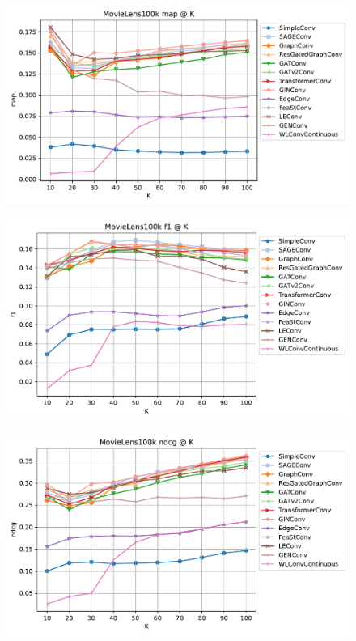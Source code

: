 \documentclass[bst/sn-nature]{sn-jnl}
\begin{document}
\begin{multicols}{2}
\begin{figure}
\begin{center}
\begin{minipage}[b]{0.48\textwidth}
    \centering
    \includegraphics[width=\textwidth]{imgs/MovieLens100k_map.pdf}
    \label{fig:map}
\end{minipage}
\hfill
\begin{minipage}[b]{0.48\textwidth}
    \centering
    \includegraphics[width=\textwidth]{imgs/MovieLens100k_f1.pdf}
    \label{fig:f1}
\end{minipage}

\begin{minipage}[b]{0.48\textwidth}
    \centering
    \includegraphics[width=\textwidth]{imgs/MovieLens100k_ndcg.pdf}
    \label{fig:ndcg}
\end{minipage}
\end{center}
\end{figure}


\end{multicols}
\end{document}
